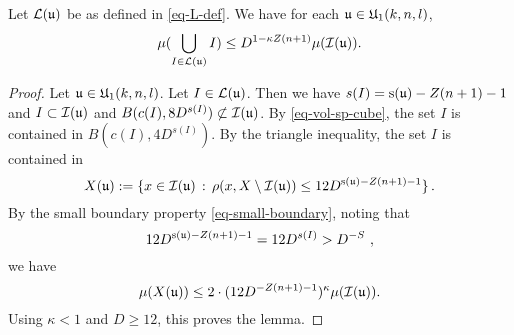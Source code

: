 \begin{lemma}
\label{boundary-exception}
\leanok
{}

Let $\mathcal{L}({\mathfrak u})$ be as defined in \eqref{eq-L-def}. We have for each ${\mathfrak u}\in {\mathfrak U}_1(k,n,l)$,
\begin{equation}
\mu(\bigcup_{I\in \mathcal{L}({\mathfrak u})} I)
\le D^{1-\kappa Z(n+1)}
        \mu({\mathcal{I}}(\mathfrak{u})).
\end{equation}
\end{lemma}
\begin{proof}
\leanok
Let ${\mathfrak u}\in {\mathfrak U}_1(k,n,l)$.
Let $I \in \mathcal{L}({\mathfrak u})$. Then we have $s(I) = {\mathrm{s}}({\mathfrak u}) - Z(n+1) - 1$ and $I \subset {\mathcal{I}}({\mathfrak u})$ and $B(c(I), 8D^{s(I)}) \not \subset {\mathcal{I}}({\mathfrak u})$.
By \eqref{eq-vol-sp-cube}, the set $I$
is contained in $B(c(I), 4D^{s(I)})$.
By the triangle inequality, the set $I$
is contained in
\begin{equation}
    X({\mathfrak u}):=\{x \in {\mathcal{I}}({\mathfrak u}) \, : \, \rho(x, X \setminus {\mathcal{I}}({\mathfrak u})) \leq 12 D^{{\mathrm{s}}({\mathfrak u}) - Z(n+1)-1}\}\,.
\end{equation}
 By the small boundary property \eqref{eq-small-boundary}, noting that
 \begin{equation*}
     12D^{{\mathrm{s}}({\mathfrak u}) - Z(n+1) - 1} = 12D^{s(I)} > D^{-S}\ ,
 \end{equation*} we have
   $$
        \mu(X({\mathfrak u})) \le
        2\cdot(12 D^{-Z(n+1)-1})^\kappa
        \mu({\mathcal{I}}(\mathfrak{u})).
    $$
Using $\kappa<1$ and $D \ge 12$, this proves the lemma.
\end{proof}

